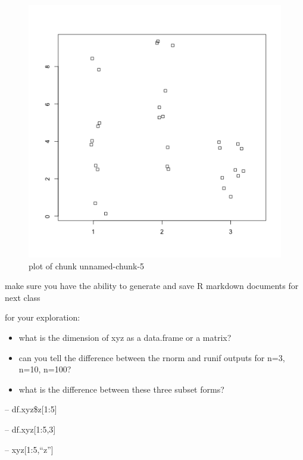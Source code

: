 \documentclass[]{article}
\begin{document}
\begin{figure}[htbp]
\centering
\includegraphics{figure/unnamed-chunk-5-2.png}
\caption{plot of chunk unnamed-chunk-5}
\end{figure}

make sure you have the ability to generate and save R markdown documents
for next class

for your exploration:

\begin{itemize}
\item
  what is the dimension of xyz as a data.frame or a matrix?
\item
  can you tell the difference between the rnorm and runif outputs for
  n=3, n=10, n=100?
\item
  what is the difference between these three subset forms?
\end{itemize}

-- df.xyz\$z{[}1:5{]}

-- df.xyz{[}1:5,3{]}

-- xyz{[}1:5,``z''{]}
\end{document}
